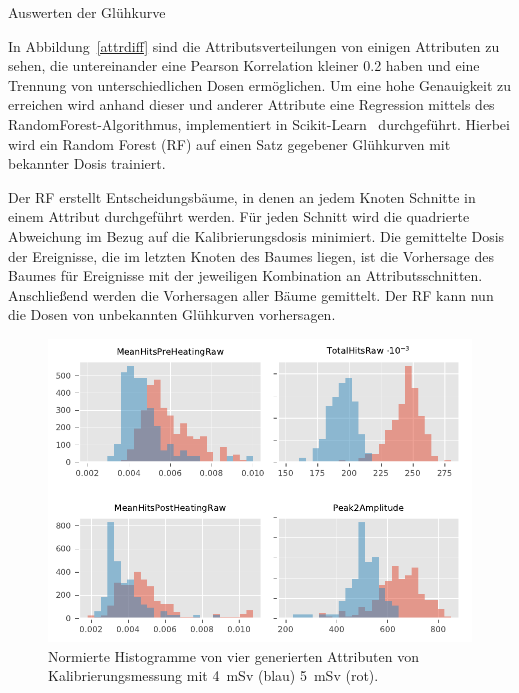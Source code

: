 \documentclass[20pt]{beamer}
\begin{document}
\begin{columns}[t, onlytextwidth]
\begin{column}{0.666\textwidth}
\begin{block}{Auswerten der Glühkurve}
\begin{multicols}{2}
                  \begin{large}
          In Abbildung~\ref{attrdiff} sind die Attributsverteilungen von einigen Attributen zu sehen, die untereinander eine Pearson Korrelation kleiner 0.2 haben und eine Trennung von unterschiedlichen Dosen ermöglichen.
                      Um eine hohe Genauigkeit zu erreichen wird anhand dieser und anderer Attribute eine Regression mittels des RandomForest-Algorithmus, implementiert in Scikit-Learn~\cite{sklearn} durchgeführt. 
                  Hierbei wird ein Random Forest (RF) auf einen Satz gegebener Glühkurven mit bekannter Dosis trainiert.
                  \end{large}

                  \begin{large}
                  Der RF erstellt Entscheidungsbäume, in denen an jedem Knoten Schnitte in einem Attribut durchgeführt werden. Für jeden Schnitt wird die quadrierte Abweichung im Bezug auf die Kalibrierungsdosis minimiert. Die gemittelte Dosis der Ereignisse, die im letzten Knoten des Baumes liegen, ist die Vorhersage des Baumes für Ereignisse mit der jeweiligen Kombination an Attributsschnitten. Anschließend werden die Vorhersagen aller Bäume gemittelt.
          Der RF kann nun die Dosen von unbekannten Glühkurven vorhersagen.
                  \end{large}
          \begin{figure}
              \includegraphics[width=\linewidth]{./python/attrDiff.pdf}
              \caption{Normierte Histogramme von vier generierten Attributen von Kalibrierungsmessung mit \SI{4}{mSv} (blau) \SI{5}{mSv} (rot).}

\end{figure}
\end{multicols}
\end{block}
\end{column}
\end{columns}
\end{document}
